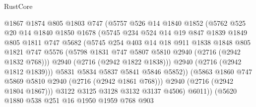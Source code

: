 \begin{lexlean}{RustCore}
\begin{coremodule}
                          @1867
                          @1874
                          @805
                          @1803
                          @747
                          (@5757
                            @526
                            @14
                            @1840
                            @1852
                            (@5762
                              @525
                              @20
                              @14
                              @1840
                              @1850
                              @1678
                              (@5745
                                @234
                                @524
                                @14
                                @19
                                @847
                                @1839
                                @1849
                                @805
                                @1811
                                @747
                                @5682
                                (@5745
                                  @254
                                  @403
                                  @14
                                  @18
                                  @911
                                  @1838
                                  @1848
                                  @805
                                  @1821
                                  @747
                                  @5576
                                  (@5798 @1831 @747 @5807 @5810 @2940 (@2716 (@2942 @1832 @768)))
                                  @2940
                                  (@2716 (@2942 @1822 @1838)))
                                @2940
                                (@2716 (@2942 @1812 @1839)))
                              @5831
                              @5834
                              @5837
                              @5841
                              @5846
                              @5852))
                          (@5863 @1860 @747 @5869 @5810 @2940 (@2716 (@2942 @1861 @768)))
                          @2940
                          (@2716 (@2942 @1804 @1867)))
                        @3122
                        @3125
                        @3128
                        @3132
                        @3137
                        @4506)
                      @6011))
                  (@5620
                    @1880
                    @538
                    @251
                    @16
                    @1950
                    @1959
                    @768
                    @903

\end{coremodule}
\end{lexlean}
